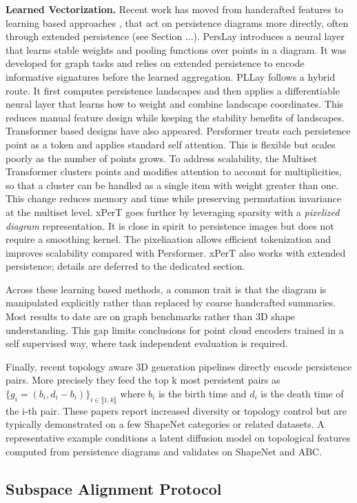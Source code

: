 \textbf{Learned Vectorization.} Recent work has moved from handcrafted features to learning based approaches \cite{adaptive_topological_feature},\cite{topological_signature} that act on persistence diagrams more directly, often through extended persistence \cite{extended_persistence} (see Section ...). PersLay \cite{perslay} introduces a neural layer that learns stable weights and pooling functions over points in a diagram. It was developed for graph tasks and relies on extended persistence to encode informative signatures before the learned aggregation. PLLay \cite{pllay} follows a hybrid route. It first computes persistence landscapes and then applies a differentiable neural layer that learns how to weight and combine landscape coordinates. This reduces manual feature design while keeping the stability benefits of landscapes. Transformer based designs have also appeared. Persformer \cite{persformer} treats each persistence point as a token and applies standard self attention. This is flexible but scales poorly as the number of points grows. To address scalability, the Multiset Transformer \cite{multiset_transformer} clusters points and modifies attention to account for multiplicities, so that a cluster can be handled as a single item with weight greater than one. This change reduces memory and time while preserving permutation invariance at the multiset level. xPerT \cite{xpert} goes further by leveraging sparsity with a \textit{pixelized diagram} representation. It is close in spirit to persistence images but does not require a smoothing kernel. The pixeliaation allows efficient tokenization and improves scalability compared with Persformer. xPerT also works with extended persistence; details are deferred to the dedicated section.

Across these learning based methods, a common trait is that the diagram is manipulated explicitly rather than replaced by coarse handcrafted summaries. Most results to date are on graph benchmarks rather than 3D shape understanding. This gap limits conclusions for point cloud encoders trained in a self supervised way, where task independent evaluation is required.

Finally, recent topology aware 3D generation pipelines \cite{topology_aware_latent_diffusion} directly encode persistence pairs. More precisely they feed the top k most persistent pairs as $\{g_i=(b_i, d_i-b_i)\}_{i \in \llbracket 1,k\rrbracket}$ where $b_i$ is the birth time and $d_i$ is the death time of the i-th pair. These papers report increased diversity or topology control but are typically demonstrated on a few ShapeNet categories or related datasets. A representative example conditions a latent diffusion model on topological features computed from persistence diagrams and validates on ShapeNet and ABC.

\subsection{Subspace Alignment Protocol}
\label{ssec:subspace_alignment_protocol}

